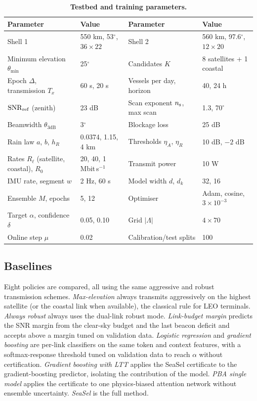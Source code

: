 \begin{table}[t]
\centering\small
\caption{\textbf{Testbed and training parameters.}}
\label{tab:params}
\begin{tabular}{@{}ll@{\hspace{1.5em}}ll@{}}
\toprule
Parameter & Value & Parameter & Value\\\midrule
Shell 1 & 550 km, 53$^\circ$, $36\times22$ & Shell 2 & 560 km, 97.6$^\circ$, $12\times20$\\
Minimum elevation $\theta_{\min}$ & 25$^\circ$ & Candidates $K$ & 8 satellites + 1 coastal\\
Epoch $\Delta$, transmission $T_x$ & 60 s, 20 s & Vessels per day, horizon & 40, 24 h\\
$\mathrm{SNR}_{\rm ref}$ (zenith) & 23 dB & Scan exponent $n_{\rm s}$, max scan & 1.3, 70$^\circ$\\
Beamwidth $\theta_{3\mathrm{dB}}$ & 3$^\circ$ & Blockage loss & 25 dB\\
Rain law $a$, $b$, $h_R$ & 0.0374, 1.15, 4 km & Thresholds $\eta_A$, $\eta_R$ & 10 dB, $-2$ dB\\
Rates $R_\ell$ (satellite, coastal), $R_0$ & 20, 40, 1 Mbit\,s$^{-1}$ & Transmit power & 10 W\\
IMU rate, segment $w$ & 2 Hz, 60 s & Model width $d$, $d_k$ & 32, 16\\
Ensemble $M$, epochs & 5, 12 & Optimiser & Adam, cosine, $3\times10^{-3}$\\
Target $\alpha$, confidence $\delta$ & 0.05, 0.10 & Grid $|\Lambda|$ & $4\times70$\\
Online step $\mu$ & 0.02 & Calibration/test splits & 100\\
\bottomrule
\end{tabular}
\end{table}

\subsection{Baselines}
Eight policies are compared, all using the same aggressive and robust transmission schemes. \emph{Max-elevation} always transmits aggressively on the highest satellite (or the coastal link when available), the classical rule for LEO terminals. \emph{Always robust} always uses the dual-link robust mode. \emph{Link-budget margin} predicts the SNR margin from the clear-sky budget and the last beacon deficit and accepts above a margin tuned on validation data. \emph{Logistic regression} and \emph{gradient boosting} are per-link classifiers on the same token and context features, with a softmax-response threshold tuned on validation data to reach $\alpha$ without certification\cite{hendrickx2024}. \emph{Gradient boosting with LTT} applies the SeaSel certificate to the gradient-boosting predictor, isolating the contribution of the model. \emph{PBA single model} applies the certificate to one physics-biased attention network without ensemble uncertainty. \emph{SeaSel} is the full method.

